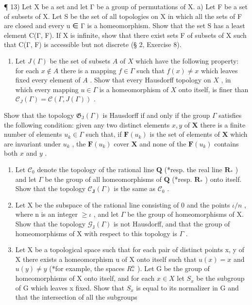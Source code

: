 ¶ 13) Let X be a set and let Γ be a group of permutations of X. a) Let F be a set of subsets of X. Let S be the set of all topologies on X in which all the sets of F are closed and every u ∈ Γ is a homeomorphism. Show that the set S has a least element C(Γ, F). If X is infinite, show that there exist sets F of subsets of X such that C(Γ, F) is accessible but not discrete (§ 2, Exercise 8).

\begin{enumerate}
\def\labelenumi{\alph{enumi})}
\setcounter{enumi}{1}
\tightlist
\item
  Let \(J(\Gamma)\) be the set of subsets \(A\) of \(X\) which have the following property: for each \(x \notin A\) there is a mapping \(f \in \Gamma\) such that \(f(x) \neq x\) which leaves fixed every element of \(A\) . Show that every Hausdorff topology on \(X\) , in which every mapping \(u \in \Gamma\) is a homeomorphism of \(X\) onto itself, is finer than \(\mathcal{C}_{J}(\Gamma) = \mathcal{C}(\Gamma, J(\Gamma))\) .
\end{enumerate}

Show that the topology \(\mathfrak{G}_{\mathrm{J}}(\Gamma)\) is Hausdorff if and only if the group \(\Gamma\) satisfies the following condition: given any two distinct elements \(x, y\) of \(\mathbf{X}\) there is a finite number of elements \(u_{k} \in \Gamma\) such that, if \(\mathbf{F}(u_{k})\) is the set of elements of \(\mathbf{X}\) which are invariant under \(u_{k}\) , the \(\mathbf{F}(u_{k})\) cover \(\mathbf{X}\) and none of the \(\mathbf{F}(u_{k})\) contains both \(x\) and \(y\) .

\begin{enumerate}
\def\labelenumi{\alph{enumi})}
\setcounter{enumi}{2}
\item
  Let \(\mathcal{C}_{0}\) denote the topology of the rational line \(\mathbf{Q}\) (*resp. the real line \(\mathbf{R}_{*}\) ) and let \(\Gamma\) be the group of all homeomorphisms of \(\mathbf{Q}\) (*resp. \(\mathbf{R}_{*}\) ) onto itself. Show that the topology \(\mathcal{C}_{\mathbf{J}}(\Gamma)\) is the same as \(\mathcal{C}_{0}\) .
\item
  Let X be the subspace of the rational line consisting of 0 and the points \(\iota/n\) , where n is an integer \(\geqslant\iota\) , and let \(\Gamma\) be the group of homeomorphisms of X. Show that the topology \(\mathcal{G}_{\mathrm{J}}(\Gamma)\) is not Hausdorff, and that the group of homeomorphisms of X with respect to this topology is \(\Gamma\) .
\item
  Let X be a topological space such that for each pair of distinct points x, y of X there exists a homeomorphism u of X onto itself such that \(u(x) = x\) and \(u(y) \neq y\) (*for example, the spaces \(R^{n}_{*}\) ). Let G be the group of homeomorphisms of X onto itself, and for each \(x \in X\) let \(S_{x}\) be the subgroup of G which leaves x fixed. Show that \(S_{x}\) is equal to its normalizer in G and that the intersection of all the subgroups
\end{enumerate}

